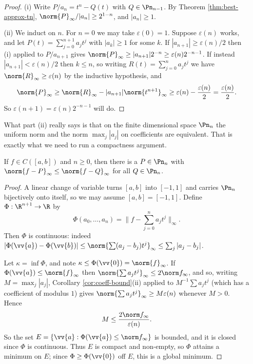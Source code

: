 \begin{proof}
	(i) Write $P/a_n = t^n - Q(t)$ with $Q \in \Pn_{n-1}$. By Theorem \ref{thm:best-approx-tn}, $\norm{P}_\infty/|a_n| \geq 2^{1-n}$, and $|a_n|\geq1$.

	(ii) We induct on $n$. For $n = 0$ we may take $\varepsilon(0)=1$. Suppose $\varepsilon(n)$ works, and let $P(t) = \sum_{j=0}^{n+1}a_jt^j$ with $|a_k|\geq1$ for some $k$. If $|a_{n+1}|\geq \varepsilon(n)/2$ then (i) applied to $P/a_{n+1}$ gives $\norm{P}_\infty\geq|a_{n+1}|2^{-n}\geq\varepsilon(n)2^{-n-1}$. If instead $|a_{n+1}|<\varepsilon(n)/2$ then $k\leq n$, so writing $R(t) = \sum_{j=0}^n a_jt^j$ we have $\norm{R}_\infty\geq\varepsilon(n)$ by the inductive hypothesis, and
	$$\norm{P}_\infty \geq \norm{R}_\infty - |a_{n+1}|\norm{t^{n+1}}_\infty \geq \varepsilon(n)-\frac{\varepsilon(n)}{2} = \frac{\varepsilon(n)}{2}.$$
	So $\varepsilon(n+1) = \varepsilon(n)2^{-n-1}$ will do.
\end{proof}

What part (ii) really says is that on the finite dimensional space $\Pn_n$ the uniform norm and the norm $\max_j|a_j|$ on coefficients are equivalent. That is exactly what we need to run a compactness argument.

\begin{theorem}\label{thm:best-exists}
	If $f\in C([a,b])$ and $n\geq0$, then there is a $P\in\Pn_n$ with $\norm{f-P}_\infty\leq\norm{f-Q}_\infty$ for all $Q\in\Pn_n$.
\end{theorem}

\begin{proof}
	A linear change of variable turns $[a,b]$ into $[-1,1]$ and carries $\Pn_n$ bijectively onto itself, so we may assume $[a,b]=[-1,1]$. Define $\Phi : \R^{n+1}\to\R$ by
	$$\Phi(a_0,\ldots,a_n) = \Big\lVert f - \sum_{j=0}^n a_jt^j\Big\rVert_\infty.$$
	Then $\Phi$ is continuous: indeed $|\Phi(\vv{a})-\Phi(\vv{b})| \leq \norm{\sum(a_j-b_j)t^j}_\infty \leq \sum_j|a_j-b_j|$.

	Let $\kappa = \inf\Phi$, and note $\kappa\leq\Phi(\vv{0}) = \norm{f}_\infty$. If $\Phi(\vv{a})\leq\norm{f}_\infty$ then $\norm{\sum a_jt^j}_\infty \leq 2\norm f_\infty$, and so, writing $M = \max_j|a_j|$, Corollary \ref{cor:coeff-bound}(ii) applied to $M^{-1}\sum a_jt^j$ (which has a coefficient of modulus $1$) gives $\norm{\sum a_jt^j}_\infty\geq M\varepsilon(n)$ whenever $M > 0$. Hence
	$$M \leq \frac{2\norm f_\infty}{\varepsilon(n)}.$$
	So the set $E = \{\vv{a} : \Phi(\vv{a})\leq\norm f_\infty\}$ is bounded, and it is closed since $\Phi$ is continuous. Thus $E$ is compact and non-empty, so $\Phi$ attains a minimum on $E$; since $\Phi \geq \Phi(\vv{0})$ off $E$, this is a global minimum.
\end{proof}

